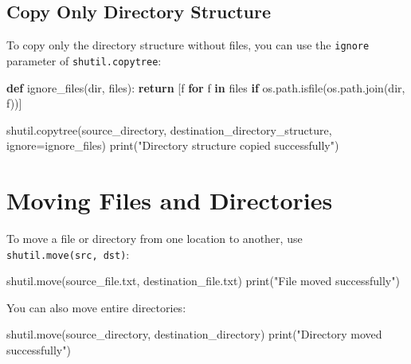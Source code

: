 \documentclass[
  letterpaper,
  DIV=11,
  numbers=noendperiod]{scrreprt}
\newenvironment{Shaded}{\begin{snugshade}}{\end{snugshade}}
\newcommand{\BuiltInTok}[1]{\textcolor[rgb]{0.00,0.23,0.31}{#1}}
\newcommand{\ControlFlowTok}[1]{\textcolor[rgb]{0.00,0.23,0.31}{\textbf{#1}}}
\newcommand{\KeywordTok}[1]{\textcolor[rgb]{0.00,0.23,0.31}{\textbf{#1}}}
\newcommand{\NormalTok}[1]{\textcolor[rgb]{0.00,0.23,0.31}{#1}}
\newcommand{\OperatorTok}[1]{\textcolor[rgb]{0.37,0.37,0.37}{#1}}
\newcommand{\StringTok}[1]{\textcolor[rgb]{0.13,0.47,0.30}{#1}}
\begin{document}
\subsection{Copy Only Directory
Structure}\label{copy-only-directory-structure}

To copy only the directory structure without files, you can use the
\texttt{ignore} parameter of \texttt{shutil.copytree}:

\begin{Shaded}
\begin{Highlighting}[]
\KeywordTok{def}\NormalTok{ ignore\_files(}\BuiltInTok{dir}\NormalTok{, files):}
    \ControlFlowTok{return}\NormalTok{ [f }\ControlFlowTok{for}\NormalTok{ f }\KeywordTok{in}\NormalTok{ files }\ControlFlowTok{if}\NormalTok{ os.path.isfile(os.path.join(}\BuiltInTok{dir}\NormalTok{, f))]}

\NormalTok{shutil.copytree(}\StringTok{\textquotesingle{}source\_directory\textquotesingle{}}\NormalTok{, }\StringTok{\textquotesingle{}destination\_directory\_structure\textquotesingle{}}\NormalTok{, ignore}\OperatorTok{=}\NormalTok{ignore\_files)}
\BuiltInTok{print}\NormalTok{(}\StringTok{"Directory structure copied successfully"}\NormalTok{)}
\end{Highlighting}
\end{Shaded}

\section{Moving Files and
Directories}\label{moving-files-and-directories}

To move a file or directory from one location to another, use
\texttt{shutil.move(src,\ dst)}:

\begin{Shaded}
\begin{Highlighting}[]
\NormalTok{shutil.move(}\StringTok{\textquotesingle{}source\_file.txt\textquotesingle{}}\NormalTok{, }\StringTok{\textquotesingle{}destination\_file.txt\textquotesingle{}}\NormalTok{)}
\BuiltInTok{print}\NormalTok{(}\StringTok{"File moved successfully"}\NormalTok{)}
\end{Highlighting}
\end{Shaded}

You can also move entire directories:

\begin{Shaded}
\begin{Highlighting}[]
\NormalTok{shutil.move(}\StringTok{\textquotesingle{}source\_directory\textquotesingle{}}\NormalTok{, }\StringTok{\textquotesingle{}destination\_directory\textquotesingle{}}\NormalTok{)}
\BuiltInTok{print}\NormalTok{(}\StringTok{"Directory moved successfully"}\NormalTok{)}
\end{Highlighting}
\end{Shaded}
\end{document}
